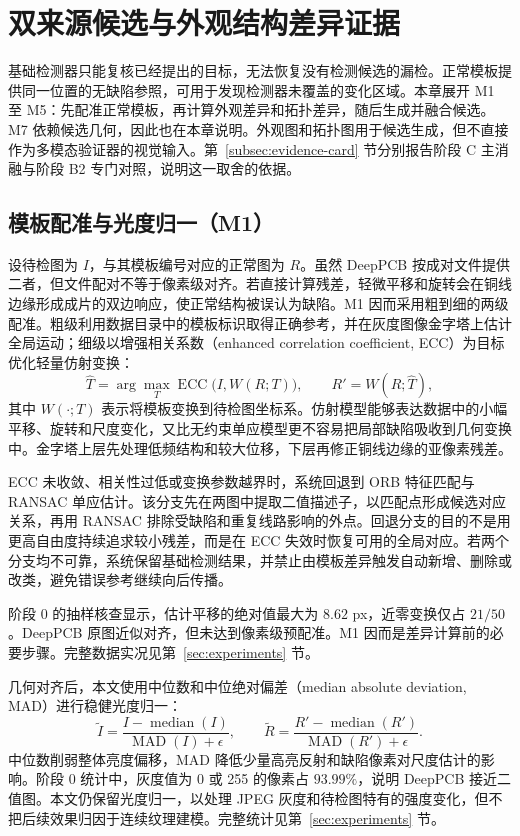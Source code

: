 \section{双来源候选与外观结构差异证据}
\label{sec:candidates}

基础检测器只能复核已经提出的目标，无法恢复没有检测候选的漏检。正常模板提供同一位置的无缺陷参照，可用于发现检测器未覆盖的变化区域。本章展开 M1 至 M5：先配准正常模板，再计算外观差异和拓扑差异，随后生成并融合候选。M7 依赖候选几何，因此也在本章说明。外观图和拓扑图用于候选生成，但不直接作为多模态验证器的视觉输入。第~\ref{subsec:evidence-card} 节分别报告阶段 C 主消融与阶段 B2 专门对照，说明这一取舍的依据。

\subsection{模板配准与光度归一（M1）}
\label{subsec:registration}

设待检图为 $I$，与其模板编号对应的正常图为 $R$。虽然 DeepPCB 按成对文件提供二者，但文件配对不等于像素级对齐。若直接计算残差，轻微平移和旋转会在铜线边缘形成成片的双边响应，使正常结构被误认为缺陷。M1 因而采用粗到细的两级配准。粗级利用数据目录中的模板标识取得正确参考，并在灰度图像金字塔上估计全局运动；细级以增强相关系数（enhanced correlation coefficient, ECC）为目标优化轻量仿射变换：
\begin{equation}
  \hat{T}=\arg\max_T \operatorname{ECC}\bigl(I,W(R;T)\bigr),
  \qquad R'=W(R;\hat{T}),
  \label{eq:ecc-registration}
\end{equation}
其中 $W(\cdot;T)$ 表示将模板变换到待检图坐标系。仿射模型能够表达数据中的小幅平移、旋转和尺度变化，又比无约束单应模型更不容易把局部缺陷吸收到几何变换中。金字塔上层先处理低频结构和较大位移，下层再修正铜线边缘的亚像素残差。

ECC 未收敛、相关性过低或变换参数越界时，系统回退到 ORB 特征匹配与 RANSAC 单应估计。该分支先在两图中提取二值描述子，以匹配点形成候选对应关系，再用 RANSAC 排除受缺陷和重复线路影响的外点。回退分支的目的不是用更高自由度持续追求较小残差，而是在 ECC 失效时恢复可用的全局对应。若两个分支均不可靠，系统保留基础检测结果，并禁止由模板差异触发自动新增、删除或改类，避免错误参考继续向后传播。

阶段 0 的抽样核查显示，估计平移的绝对值最大为 $8.62$ px，近零变换仅占 $21/50$。DeepPCB 原图近似对齐，但未达到像素级预配准。M1 因而是差异计算前的必要步骤。完整数据实况见第~\ref{sec:experiments} 节。

几何对齐后，本文使用中位数和中位绝对偏差（median absolute deviation, MAD）进行稳健光度归一：
\begin{equation}
  \widetilde I=\frac{I-\operatorname{median}(I)}{\operatorname{MAD}(I)+\epsilon},
  \qquad
  \widetilde R=\frac{R'-\operatorname{median}(R')}{\operatorname{MAD}(R')+\epsilon}.
  \label{eq:mad-normalization}
\end{equation}
中位数削弱整体亮度偏移，MAD 降低少量高亮反射和缺陷像素对尺度估计的影响。阶段 0 统计中，灰度值为 0 或 255 的像素占 $93.99\%$，说明 DeepPCB 接近二值图。本文仍保留光度归一，以处理 JPEG 灰度和待检图特有的强度变化，但不把后续效果归因于连续纹理建模。完整统计见第~\ref{sec:experiments} 节。

